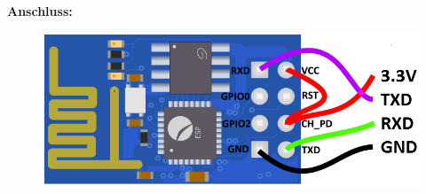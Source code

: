 

\textbf{Anschluss:} 

\begin{figure}[ht]
  \centering
  \includegraphics[scale=0.42]{images/ESP8266.png}	
  \label{ESP8266-01}
\end{figure}



